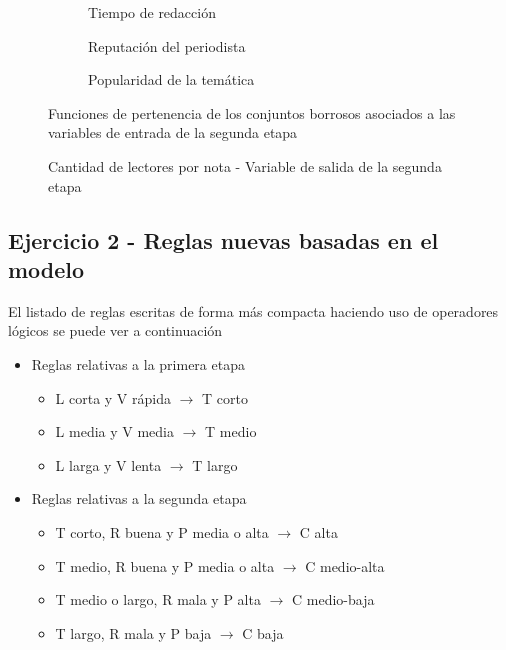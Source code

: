 \documentclass{article}
\begin{document}
\begin{figure}[H]
	\centering
	\begin{subfigure}[b]{0.3\textwidth}
		\centering
		\caption{Tiempo de redacción}
	\end{subfigure}
	\hfill
	\begin{subfigure}[b]{0.3\textwidth}
		\centering
		\caption{Reputación del periodista}
	\end{subfigure}
	\hfill
	\begin{subfigure}[b]{0.3\textwidth}
		\centering
		\caption{Popularidad de la temática}
	\end{subfigure}
	\caption{Funciones de pertenencia de los conjuntos borrosos asociados a las variables de entrada de la segunda etapa}
	\label{fig:etapa2-entrada}
\end{figure}

\begin{figure}[H]
	\centering
	\caption{Cantidad de lectores por nota - Variable de salida de la segunda etapa}
	\label{fig:etapa2-salida}
\end{figure}

\pagebreak
\subsection*{Ejercicio 2 - Reglas nuevas basadas en el modelo}
El listado de reglas escritas de forma más compacta haciendo uso de operadores lógicos se puede ver a continuación

\begin{itemize}
	\item Reglas relativas a la primera etapa
	\begin{itemize}
		\item L corta y V rápida $\rightarrow$ T corto
		\item L media y V media $\rightarrow$ T medio
		\item L larga y V lenta $\rightarrow$ T largo
	\end{itemize}
	\item Reglas relativas a la segunda etapa
	\begin{itemize}
		\item T corto, R buena y P media o alta $\rightarrow$ C alta
		\item T medio, R buena y P media o alta $\rightarrow$ C medio-alta
		\item T medio o largo, R mala y P alta $\rightarrow$ C medio-baja
		\item T largo, R mala y P baja $\rightarrow$ C baja
	\end{itemize}
\end{itemize}
\end{document}
